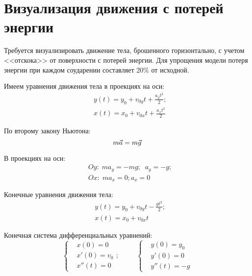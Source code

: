 \newpage
\section[Визуализация движения с потерей энергии]{Визуализация движения с потерей энергии}

Требуется визуализировать движение тела, брошенного горизонтально, с учетом <<отскока>>  от поверхности с потерей энергии.
Для упрощения модели потеря энергии при каждом соударении составляет 20\% от исходной.

Имеем уравнения движения тела в проекциях на оси:
\begin{equation*}
    \begin{aligned}
        &y(t) = y_{0} + v_{0y}t+\frac{a_{y}t^{2}}{2}; \\
        &x(t) = x_{0} + v_{0x}t+\frac{a_{x}t^{2}}{2}
    \end{aligned}
\end{equation*}

По второму закону Ньютона:
\begin{equation*}
    m\vec{a} = m\vec{g} \\
\end{equation*}

В проекциях на оси:
\begin{equation*}
    \begin{aligned}
        &Oy: \; ma_{y} = -mg; \;\; 
        a_{y} = -g; \\
        &Ox: \; ma_{x} = 0;
        a_{x} = 0
    \end{aligned}
\end{equation*}

Конечные уравнения движения тела:
\begin{equation*}
    \begin{aligned}
        &y(t) = y_{0} + v_{0y}t - \frac{gt^{2}}{2};\\
        &x(t) = x_{0} + v_{0x}t
    \end{aligned}
\end{equation*}

Конечная система дифференциальных уравнений:
\begin{equation*}
    \left\{
        \begin{aligned}
            &x(0) = 0 \\
            &x'(0) = v_{0} \\
            &x''(t) = 0
        \end{aligned}
    \right.; \;\;\;\;\;\;\;\;\;
    \left\{
        \begin{aligned}
            &y(0) = y_{0} \\
            &y'(0) = 0 \\
            &y''(t) = -g
        \end{aligned}
    \right. 
\end{equation*}

